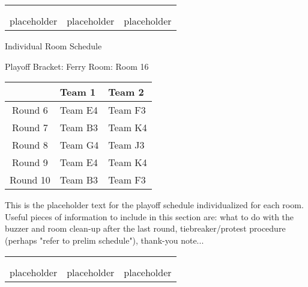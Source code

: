 \documentclass{article}%
\begin{document}
%
\begin{tabularx}{\textwidth}{YYY}%
  &  &  \\%
\\%
placeholder&placeholder&placeholder\\%
\end{tabularx}%
\newpage%
\begin{center}%
\begin{Huge}%
Individual Room Schedule%
\end{Huge}%
\vspace*{16pt}%
\linebreak%
\begin{Large}%
Playoff Bracket: Ferry \hfill Room: Room 16%
\end{Large}%
\end{center}%
%
\begin{tabularx}{\textwidth}{|c|Y|Y|}%
\hline%
&Team 1&Team 2\\%
\hline%
Round 6&Team E4&Team F3\\%
Round 7&Team B3&Team K4\\%
Round 8&Team G4&Team J3\\%
Round 9&Team E4&Team K4\\%
Round 10&Team B3&Team F3\\%
\hline%
\end{tabularx}%
\vspace*{16pt}%
\linebreak%
This is the placeholder text for the playoff schedule individualized for each room. Useful pieces of information to include in this section are: what to do with the buzzer and room clean{-}up after the last round, tiebreaker/protest procedure (perhaps "refer to prelim schedule"), thank{-}you note...%
\vspace*{30pt}%
\newline%
%
\begin{tabularx}{\textwidth}{YYY}%
  &  &  \\%
\\%
placeholder&placeholder&placeholder\\%
\end{tabularx}%
\end{document}
